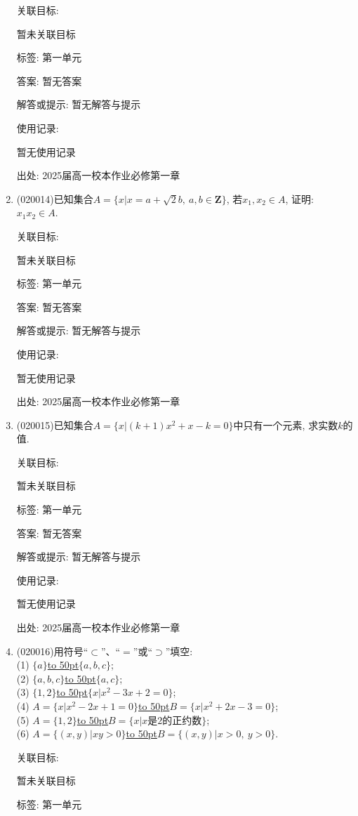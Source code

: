 \documentclass[10pt,a4paper]{article}
\newcommand{\blank}[1]{\underline{\hbox to #1pt{}}}
\begin{document}
\begin{enumerate}[1.]
关联目标:

暂未关联目标



标签: 第一单元

答案: 暂无答案

解答或提示: 暂无解答与提示

使用记录:

暂无使用记录


出处: 2025届高一校本作业必修第一章
\item { (020014)}已知集合$A=\{x|x=a+\sqrt 2b,\ a,b\in \mathbf{Z}\}$, 若$x_1,x_2\in A$, 证明: $x_1x_2\in A$.


关联目标:

暂未关联目标



标签: 第一单元

答案: 暂无答案

解答或提示: 暂无解答与提示

使用记录:

暂无使用记录


出处: 2025届高一校本作业必修第一章
\item { (020015)}已知集合$A=\{x|(k+1)x^2+x-k=0\}$中只有一个元素, 求实数$k$的值.


关联目标:

暂未关联目标



标签: 第一单元

答案: 暂无答案

解答或提示: 暂无解答与提示

使用记录:

暂无使用记录


出处: 2025届高一校本作业必修第一章
\item { (020016)}用符号``$\subset$''、``$=$''或``$\supset$''填空:\\
(1) $\{a\}$\blank{50}$\{a, b, c\}$;\\
(2) $\{a, b, c\}$\blank{50}$\{a, c\}$;\\
(3) $\{1, 2\}$\blank{50}$\{x|x^2-3x+2=0\}$;\\
(4) $A=\{x|x^2-2x+1=0\}$\blank{50}$B=\{x|x^2+2x-3=0\}$;\\
(5) $A=\{1, 2\}$\blank{50}$B=\{x|x$是$2$的正约数$\}$;\\
(6) $A=\{(x, y)|xy>0\}$\blank{50}$B=\{(x, y)|x>0, \ y>0\}$.


关联目标:

暂未关联目标



标签: 第一单元


\end{enumerate}
\end{document}
